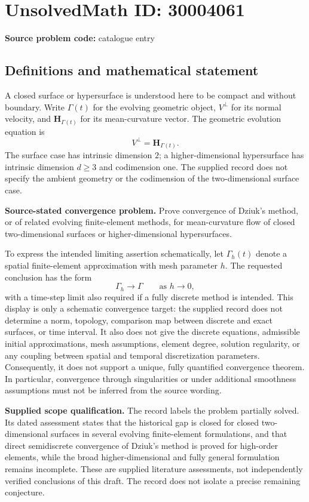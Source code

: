 \documentclass[11pt]{article}
\begin{document}
\section*{UnsolvedMath ID: 30004061}
\textbf{Source problem code:} catalogue entry
\subsection{Definitions and mathematical statement}
A closed surface or hypersurface is understood here to be compact and without boundary. Write \(\Gamma(t)\) for the evolving geometric object, \(V^\perp\) for its normal velocity, and \(\mathbf H_{\Gamma(t)}\) for its mean-curvature vector. The geometric evolution equation is
\[
V^\perp=\mathbf H_{\Gamma(t)}.
\]
The surface case has intrinsic dimension \(2\); a higher-dimensional hypersurface has intrinsic dimension \(d\geq 3\) and codimension one. The supplied record does not specify the ambient geometry or the codimension of the two-dimensional surface case.

\textbf{Source-stated convergence problem.} Prove convergence of Dziuk's method, or of related evolving finite-element methods, for mean-curvature flow of closed two-dimensional surfaces or higher-dimensional hypersurfaces.

To express the intended limiting assertion schematically, let \(\Gamma_h(t)\) denote a spatial finite-element approximation with mesh parameter \(h\). The requested conclusion has the form
\[
\Gamma_h\longrightarrow\Gamma\qquad\text{as }h\to0,
\]
with a time-step limit also required if a fully discrete method is intended. This display is only a schematic convergence target: the supplied record does not determine a norm, topology, comparison map between discrete and exact surfaces, or time interval. It also does not give the discrete equations, admissible initial approximations, mesh assumptions, element degree, solution regularity, or any coupling between spatial and temporal discretization parameters. Consequently, it does not support a unique, fully quantified convergence theorem. In particular, convergence through singularities or under additional smoothness assumptions must not be inferred from the source wording.

\textbf{Supplied scope qualification.} The record labels the problem partially solved. Its dated assessment states that the historical gap is closed for closed two-dimensional surfaces in several evolving finite-element formulations, and that direct semidiscrete convergence of Dziuk's method is proved for high-order elements, while the broad higher-dimensional and fully general formulation remains incomplete. These are supplied literature assessments, not independently verified conclusions of this draft. The record does not isolate a precise remaining conjecture.
\end{document}
